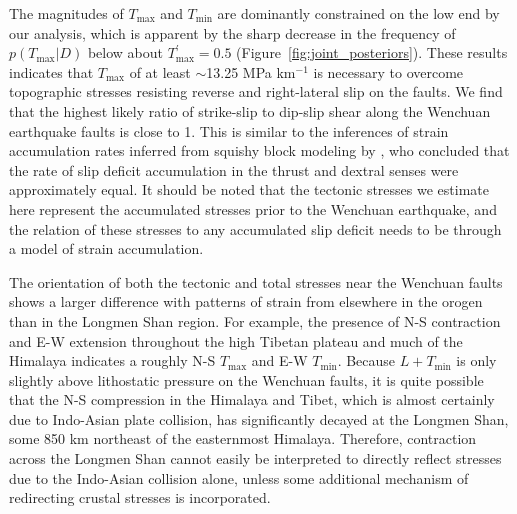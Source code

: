 \documentclass[draft,jgrga]{AGUTeX}
\begin{document}
\begin{article}

The magnitudes of $T_{\mathrm{max}}$ and $T_{\mathrm{min}}$ are
dominantly constrained on the low end by our analysis, which is apparent
by the sharp decrease in the frequency of $p(T_{\mathrm{max}}|D)$ below
about $T^\prime_{\mathrm{max}} = 0.5$ (Figure~\ref{fig:joint_posteriors}). 
These results indicates that $T_{\mathrm{max}}$ of at
least $\sim$13.25 MPa km$^{-1}$ is necessary to overcome
topographic stresses resisting reverse and right-lateral slip on the
faults. We find that the highest likely ratio of strike-slip to dip-slip
shear along the Wenchuan earthquake faults is close to 1. This is
similar to the inferences of strain accumulation rates inferred from
squishy block modeling by \citet{loveless2011}, who
concluded that the rate of slip deficit accumulation in the thrust and
dextral senses were approximately equal. It should be noted that the
tectonic stresses we estimate here represent the accumulated stresses
prior to the Wenchuan earthquake, and the relation of these stresses to any
accumulated slip deficit needs to be through a model of strain
accumulation.

The orientation of both the tectonic and total stresses near the
Wenchuan faults shows a larger difference with patterns of strain from
elsewhere in the orogen than in the Longmen Shan region. For example, the
presence of N-S contraction and E-W extension throughout the high Tibetan
plateau and much of the Himalaya \citep[e.g.,][]{armijo1986, molnar1988,
taylor2003} indicates a roughly N-S $T_{\mathrm{max}}$ and E-W
$T_{\mathrm{min}}$. Because $ L + T_{\mathrm{min}}$ is only slightly above
lithostatic pressure on the Wenchuan faults, it is quite possible that the N-S
compression in the Himalaya and Tibet, which is almost certainly due to
Indo-Asian plate collision, has significantly decayed at the Longmen Shan, some
850 km northeast of the easternmost Himalaya. Therefore, contraction across the
Longmen Shan cannot easily be interpreted to directly reflect stresses due to
the Indo-Asian collision alone, unless some additional mechanism of redirecting
crustal stresses is incorporated.


\end{article}
\end{document}
